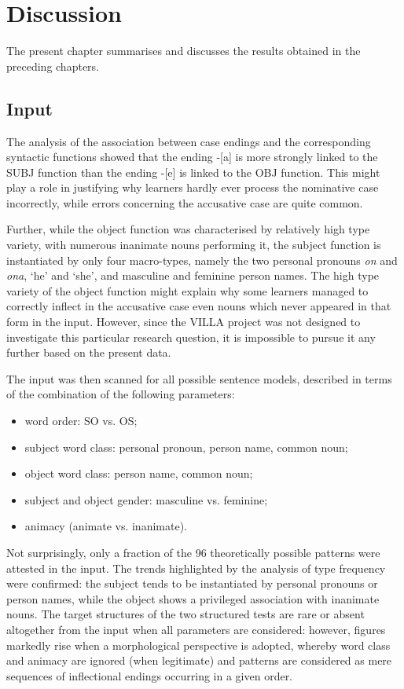\chapter{Discussion}\label{sec:7}

The present chapter summarises and discusses the results obtained in the preceding chapters.

\section{Input}\label{sec:08:1}

The analysis of the association between case endings and the corresponding syntactic functions showed that the ending -[a] is more strongly linked to the SUBJ function than the ending -[e] is linked to the OBJ function. This might play a role in justifying why learners hardly ever process the nominative case incorrectly, while errors concerning the accusative case are quite common. 

Further, while the object function was characterised by relatively high type variety, with numerous inanimate nouns performing it, the subject function is instantiated by only four macro-types, namely the two personal pronouns \textit{on} and \textit{ona}, ‘he’ and ‘she’, and masculine and feminine person names. The high type variety of the object function might explain why some learners managed to correctly inflect in the accusative case even nouns which never appeared in that form in the input. However, since the VILLA project was not designed to investigate this particular research question, it is impossible to pursue it any further based on the present data. 

The input was then scanned for all possible sentence models, described in terms of the combination of the following parameters:

\largerpage
\begin{itemize}
    \item word order: SO vs. OS;
    \item subject word class: personal pronoun, person name, common noun;
    \item object word class: person name, common noun;
    \item subject and object gender: masculine vs. feminine;
    \item animacy (animate vs. inanimate).
\end{itemize}

Not surprisingly, only a fraction of the 96 theoretically possible patterns were attested in the input. The trends highlighted by the analysis of type frequency were confirmed: the subject tends to be instantiated by personal pronouns or person names, while the object shows a privileged association with inanimate nouns. The target structures of the two structured tests are rare or absent altogether from the input when all parameters are considered: however, figures markedly rise when a morphological perspective is adopted, whereby word class and animacy are ignored (when legitimate) and patterns are considered as mere sequences of inflectional endings occurring in a given order.

